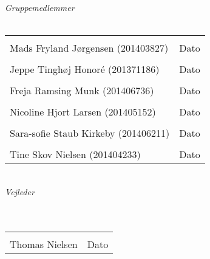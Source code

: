 \begin{vplace}[0.6]
{\large \textit{Gruppemedlemmer}}
\\
\\

\noindent \begin{tabular}{ll}
	\makebox[3.0in]{\hrulefill} & \makebox[1.5in]{\hrulefill}\\
	Mads Fryland Jørgensen (201403827) & Dato\\[7ex]%
	\makebox[3in]{\hrulefill} & \makebox[1.5in]{\hrulefill}\\
	Jeppe Tinghøj Honoré (201371186) & Dato\\[7ex]
	\makebox[3in]{\hrulefill} & \makebox[1.5in]{\hrulefill}\\
	Freja Ramsing Munk (201406736) & Dato\\[7ex]
	\makebox[3in]{\hrulefill} & \makebox[1.5in]{\hrulefill}\\
	Nicoline Hjort Larsen (201405152) & Dato\\[7ex]
	\makebox[3in]{\hrulefill} & \makebox[1.5in]{\hrulefill}\\
	Sara-sofie Staub Kirkeby (201406211) & Dato\\[7ex]
	\makebox[3in]{\hrulefill} & \makebox[1.5in]{\hrulefill}\\
	Tine Skov Nielsen (201404233) & Dato\\[7ex]
	
	
\end{tabular}
\\
{\large \textit{Vejleder}}
\\
\\
\\
\noindent \begin{tabular}{ll}
	\makebox[3.0in]{\hrulefill} & \makebox[1.5in]{\hrulefill}\\
	Thomas Nielsen & Dato\\[8ex]
\end{tabular}
\end{vplace}